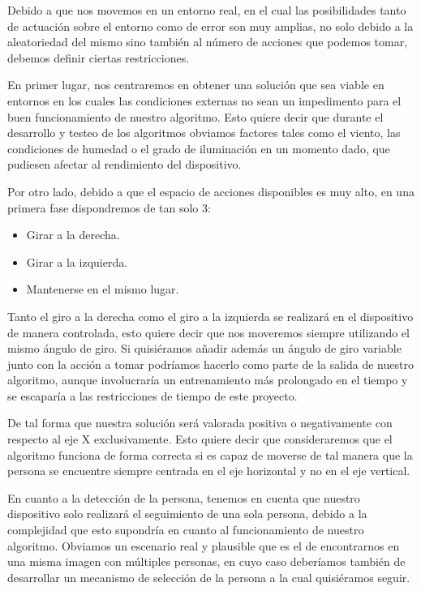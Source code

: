 Debido a que nos movemos en un entorno real, en el cual las posibilidades tanto de actuación sobre el entorno como de error son muy amplias, no solo debido a la aleatoriedad del mismo sino también al número de acciones que podemos tomar, debemos definir ciertas restricciones.
\medskip

En primer lugar, nos centraremos en obtener una solución que sea viable en entornos en los cuales las condiciones externas no sean un impedimento para el buen funcionamiento de nuestro algoritmo. Esto quiere decir que durante el desarrollo y testeo de los algoritmos obviamos factores tales como el viento, las condiciones de humedad o el grado de iluminación en un momento dado, que pudiesen afectar al rendimiento del dispositivo.
\medskip

Por otro lado, debido a que el espacio de acciones disponibles es muy alto, en una primera fase dispondremos de tan solo 3: 

\begin{itemize}
  \item Girar a la derecha.
  \item Girar a la izquierda.
  \item Mantenerse en el mismo lugar.
\end{itemize}
\medskip

Tanto el giro a la derecha como el giro a la izquierda se realizará en el dispositivo de manera controlada, esto quiere decir que nos moveremos siempre utilizando el mismo ángulo de giro. Si quisiéramos añadir además un ángulo de giro variable junto con la acción a tomar podríamos hacerlo como parte de la salida de nuestro algoritmo, aunque involucraría un entrenamiento más prolongado en el tiempo y se escaparía a las restricciones de tiempo de este proyecto.
\medskip

De tal forma que nuestra solución será valorada positiva o negativamente con respecto al eje X exclusivamente. Esto quiere decir que consideraremos que el algoritmo funciona de forma correcta si es capaz de moverse de tal manera que la persona se encuentre siempre centrada en el eje horizontal y no en el eje vertical.
\medskip

En cuanto a la detección de la persona, tenemos en cuenta que nuestro dispositivo solo realizará el seguimiento de una sola persona, debido a la complejidad que esto supondría en cuanto al funcionamiento de nuestro algoritmo. Obviamos un escenario real y plausible que es el de encontrarnos en una misma imagen con múltiples personas, en cuyo caso deberíamos también de desarrollar un mecanismo de selección de la persona a la cual quisiéramos seguir.
\medskip

